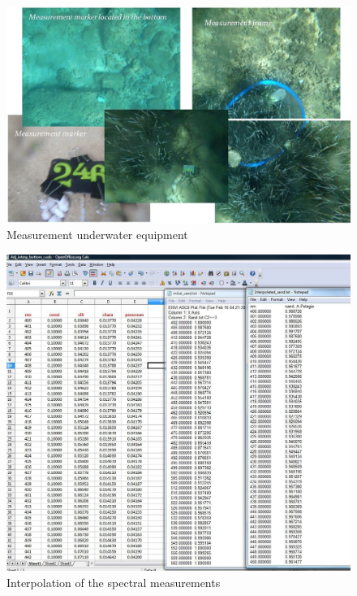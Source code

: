 \documentclass[10pt, a4paper]{article}
\begin{document}
\begin{appendices}
\begin{figure}[h]
\begin{center}
\includegraphics[scale=0.35]{Fig-3-16.jpg}
\caption{Measurement underwater equipment}
\label{fig:66}
\end{center}
\end{figure}
\pagebreak
\newpage


\begin{figure}[h]
\begin{center}
\includegraphics[scale=0.30]{Interpolation.jpg}
\caption{Interpolation of the spectral measurements}
\label{fig:67}
\end{center}
\end{figure}


\end{appendices}
\end{document}
